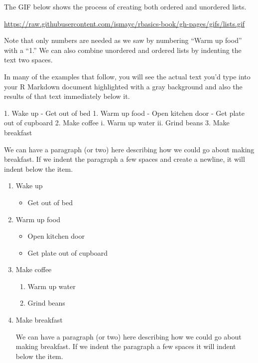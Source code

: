 \documentclass[]{tufte-book}
\newenvironment{Shaded}{\begin{snugshade}}{\end{snugshade}}
\newcommand{\FloatTok}[1]{\textcolor[rgb]{0.00,0.00,0.81}{{#1}}}
\newcommand{\NormalTok}[1]{{#1}}
\providecommand{\tightlist}{%
  \setlength{\itemsep}{0pt}\setlength{\parskip}{0pt}}
\theoremstyle{definition}
\theoremstyle{definition}
\theoremstyle{remark}
\begin{document}
The GIF below shows the process of creating both ordered and unordered
lists.

\vspace{0.1in}

\begin{center}\footnotesize{\url{https://raw.githubusercontent.com/ismayc/rbasics-book/gh-pages/gifs/lists.gif}}\end{center}

\vspace{0.1in}

Note that only numbers are needed as we saw by numbering ``Warm up
food'' with a ``1.'' We can also combine unordered and ordered lists by
indenting the text two spaces.

In many of the examples that follow, you will see the actual text you'd
type into your R Markdown document highlighted with a gray background
and also the results of that text immediately below it.

\begin{Shaded}
\begin{Highlighting}[]
\NormalTok{1. }\FloatTok{Wake up}
\FloatTok{  - Get out of bed}
\FloatTok{1. Warm up food}
\FloatTok{  - Open kitchen door}
\FloatTok{  - Get plate out of cupboard}
\FloatTok{2. Make coffee}
\FloatTok{  i. Warm up water}
\FloatTok{  ii. Grind beans}
\FloatTok{3. Make breakfast}

\FloatTok{  We can have a paragraph (or two) here describing how we could go about making}
\FloatTok{  breakfast.  If we indent the paragraph a few spaces and create a newline, it }
\FloatTok{  will indent below the item.}
\end{Highlighting}
\end{Shaded}

\begin{enumerate}
\def\labelenumi{\arabic{enumi}.}
\item
  Wake up

  \begin{itemize}
  \tightlist
  \item
    Get out of bed
  \end{itemize}
\item
  Warm up food

  \begin{itemize}
  \tightlist
  \item
    Open kitchen door
  \item
    Get plate out of cupboard
  \end{itemize}
\item
  Make coffee

  \begin{enumerate}
  \def\labelenumii{\roman{enumii}.}
  \tightlist
  \item
    Warm up water
  \item
    Grind beans
  \end{enumerate}
\item
  Make breakfast

  We can have a paragraph (or two) here describing how we could go about
  making breakfast. If we indent the paragraph a few spaces it will
  indent below the item.
\end{enumerate}
\end{document}
